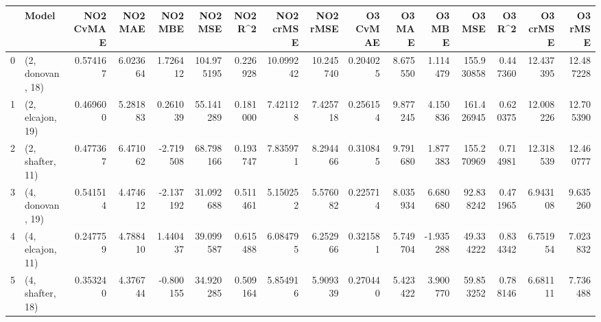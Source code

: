 \begin{tabular}{llrrrrrrrrrrrrrr}
\toprule
{} &             Model &  NO2 CvMAE &   NO2 MAE &   NO2 MBE &     NO2 MSE &   NO2 R\textasciicircum2 &  NO2 crMSE &   NO2 rMSE &  O3 CvMAE &    O3 MAE &    O3 MBE &      O3 MSE &    O3 R\textasciicircum2 &   O3 crMSE &    O3 rMSE \\
\midrule
0 &  (2, donovan, 18) &   0.574167 &  6.023664 &  1.726412 &  104.975195 &  0.226928 &  10.099242 &  10.245740 &  0.204025 &  8.675550 &  1.114479 &  155.930858 &  0.447360 &  12.437395 &  12.487228 \\
1 &  (2, elcajon, 19) &   0.469600 &  5.281883 &  0.261039 &   55.141289 &  0.181000 &   7.421128 &   7.425718 &  0.256154 &  9.877245 &  4.150836 &  161.426945 &  0.620375 &  12.008226 &  12.705390 \\
2 &  (2, shafter, 11) &   0.477367 &  6.471062 & -2.719508 &   68.798166 &  0.193747 &   7.835971 &   8.294466 &  0.310845 &  9.791680 &  1.877383 &  155.270969 &  0.714981 &  12.318539 &  12.460777 \\
3 &  (4, donovan, 19) &   0.541514 &  4.474612 & -2.137192 &   31.092688 &  0.511461 &   5.150252 &   5.576082 &  0.225714 &  8.035934 &  6.680680 &   92.838242 &  0.471965 &   6.943108 &   9.635260 \\
4 &  (4, elcajon, 11) &   0.247759 &  4.788410 &  1.440437 &   39.099587 &  0.615488 &   6.084795 &   6.252966 &  0.321581 &  5.749704 & -1.935288 &   49.334222 &  0.834342 &   6.751954 &   7.023832 \\
5 &  (4, shafter, 18) &   0.353240 &  4.376744 & -0.800155 &   34.920285 &  0.509164 &   5.854916 &   5.909339 &  0.270440 &  5.423422 &  3.900770 &   59.853252 &  0.788146 &   6.681111 &   7.736488 \\
\bottomrule
\end{tabular}
